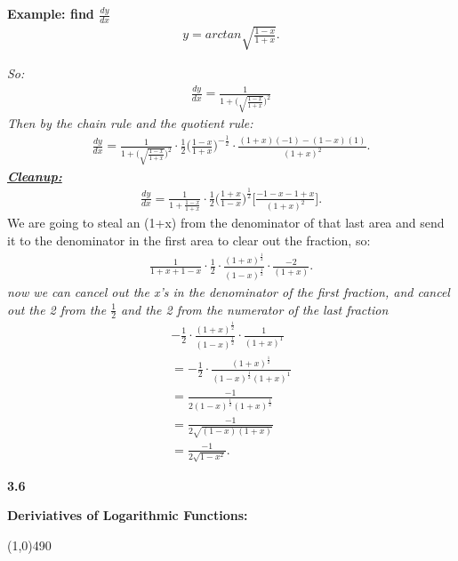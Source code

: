 \documentclass{report}
\begin{document}
  \bigbreak \noindent 
  \begin{mdframed}
    \textbf{Example: find $\frac{dy}{dx}$}
    \begin{align*}
      y = arctan\sqrt{\frac{1-x}{1+x}}
    .\end{align*}
  \end{mdframed}
  \bigbreak \noindent
  \textit{So:}
  \begin{align*}
    \frac{dy}{dx} = \frac{1}{1+\bigg(\sqrt{\frac{1-x}{1+x}}\bigg)^2}
  \end{align*}
  \bigbreak \noindent 
  \textit{Then by the chain rule and the quotient rule:}
  \begin{align*}
    \frac{dy}{dx} = \frac{1}{1+\bigg(\sqrt{\frac{1-x}{1+x}}\bigg)^2} \cdot \frac{1}{2}\bigg(\frac{1-x}{1+x}\bigg)^{-\frac{1}{2}} \cdot \frac{(1+x)(-1)-(1-x)(1)}{(1+x)^{2}}
  .\end{align*}
  \bigbreak \noindent 
  \textbf{\textit{\underline{Cleanup:}}}
  \begin{align*}
    \frac{dy}{dx} = \frac{1}{1+\frac{1-x}{1+x}} \cdot \frac{1}{2}\bigg(\frac{1+x}{1-x}\bigg)^{\frac{1}{2}}\bigg[\frac{-1-x-1+x}{(1+x)^{2}}\bigg]
  .\end{align*}
  \bigbreak \noindent 
  We are going to steal an (1+x) from the denominator of that last area and send it to the denominator in the first area to clear out the fraction, so:
  \begin{align*}
    \frac{1}{1+x+1-x} \cdot \frac{1}{2} \cdot \frac{(1+x)^{\frac{1}{2}}}{(1-x)^{\frac{1}{2}}} \cdot \frac{-2}{(1+x)}
  .\end{align*}
  \bigbreak \noindent 
  \textit{now we can cancel out the x's in the denominator of the first fraction, and cancel out the 2 from the $\frac{1}{2}$ and the 2 from the numerator of the last fraction}
  \begin{align*}
    -\frac{1}{2}\cdot \frac{(1+x)^{\frac{1}{2}}}{(1-x)^{\frac{1}{2}}} \cdot \frac{1}{(1+x)^{1}} \\
    = -\frac{1}{2} \cdot \frac{(1+x)^{\frac{1}{2}}}{(1-x)^{\frac{1}{2}}(1+x)^{1}} \\
    = \frac{-1}{2(1-x)^{\frac{1}{2}}(1+x)^{\frac{1}{2}}} \\
     = \frac{-1}{2\sqrt{(1-x)(1+x)}} \\
    = \frac{-1}{2\sqrt{1-x^{2}}}
  .\end{align*}

  \pagebreak \bigbreak \noindent
  \begin{Large}
      \begin{mdframed}
          \begin{center}
              \textbf{3.6}
          \end{center}
      \end{mdframed}
  \end{Large}
  \begin{Large}
      \begin{center}
          \textbf{Deriviatives of Logarithmic Functions:}
      \end{center}
  \end{Large}
  \line(1,0){490}
  
\end{document}
